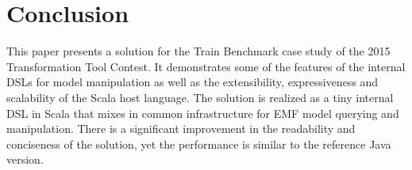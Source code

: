 
\enlargethispage{10mm}


\section{Conclusion}
\label{sec:Conclusion}

This paper presents a solution for the Train Benchmark case study of the 2015 Transformation Tool Contest.
It demonstrates some of the features of the \SIGMA internal DSLs for model manipulation as well as the extensibility, expressiveness and scalability of the Scala host language.
The solution is realized as a tiny internal DSL in Scala that mixes in \SIGMA common infrastructure for EMF model querying and manipulation.
There is a significant improvement in the readability and conciseness of the solution, yet the performance is similar to the reference Java version.












